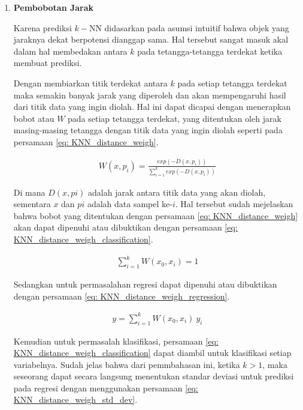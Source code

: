 \begin{subs}
\begin{enumerate}[label=\textbf{\alph*).}]
		\item \textbf{Pembobotan Jarak}
		
		Karena prediksi $k-$NN didasarkan pada asumsi intuitif bahwa objek yang jaraknya dekat berpotensi dianggap sama. Hal tersebut sangat masuk akal dalam hal membedakan antara $k$ pada tetangga-tetangga terdekat ketika membuat prediksi. 
		\vspace{1ex}
		
		Dengan membiarkan titik terdekat antara $k$ pada setiap tetangga terdekat maka semakin banyak jarak yang diperoleh dan akan mempengaruhi hasil dari titik data yang ingin diolah. Hal ini dapat dicapai dengan menerapkan bobot atau $W$ pada setiap tetangga terdekat, yang ditentukan oleh jarak masing-masing tetangga dengan titik data yang ingin diolah seperti pada persamaan \ref{eq: KNN_distance_weigh}.
		\vspace{1ex}
		
		\begin{equation}\label{eq: KNN_distance_weigh}
		\begin{split}
		W(x, p_{i}) = \frac{exp(-D(x, p_{i}))}{\sum_{i = 1}^{k}exp(-D(x, p_{i}))}
		\end{split}
		\end{equation}
		
		Di mana $D(x, pi)$ adalah jarak antara titik data yang akan diolah, sementara $x$ dan $pi$ adalah data sampel ke-$i$. Hal tersebut sudah mejelaskan bahwa bobot yang ditentukan dengan persamaan \ref{eq: KNN_distance_weigh} akan dapat dipenuhi atau dibuktikan dengan persamaan \ref{eq: KNN_distance_weigh_classification}.
		
		\begin{equation}\label{eq: KNN_distance_weigh_classification}
		\begin{split}
		\sum_{i = 1}^{k} W(x_{0}, x_{i}) = 1
		\end{split}
		\end{equation}
		
		Sedangkan untuk permasalahan regresi dapat dipenuhi atau dibuktikan dengan persamaan \ref{eq: KNN_distance_weigh_regression}.
		
		\begin{equation}\label{eq: KNN_distance_weigh_regression}
		\begin{split}
		y = \sum_{i = 1}^{k} W(x_{0}, x_{i})\ y_{i}
		\end{split}
		\end{equation}
		
		Kemudian untuk permasalah klasifikasi, persamaan \ref{eq: KNN_distance_weigh_classification} dapat diambil untuk klasifikasi setiap variabelnya. Sudah jelas bahwa dari pemmbahasan ini, ketika $k > 1$, maka seseorang dapat secara langsung menentukan standar deviasi untuk prediksi pada regresi dengan menggunakan persamaan \ref{eq: KNN_distance_weigh_std_dev}.
		

\end{enumerate}
\end{subs}
